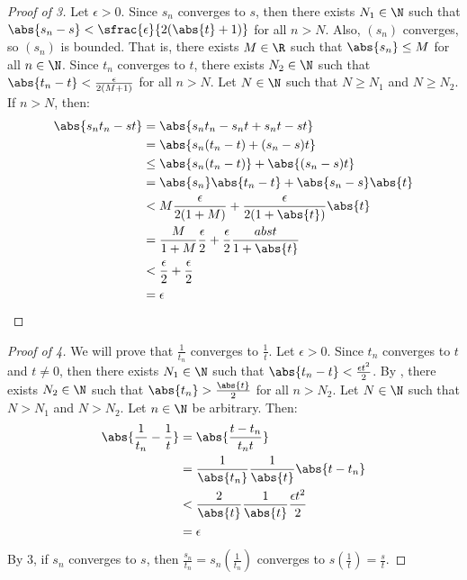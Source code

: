 \begin{thmbox}{}{}
    \begin{proof}[Proof of 3]
        Let $\epsilon > 0$. Since $s_n$ converges to $s$, then there exists $N_1 \in \N$ such that $\abs{s_n - s} < \sfrac{\epsilon}{2(\abs{t} + 1)}$ for all $n > N$. Also, $(s_n)$ converges, so $(s_n)$ is bounded. That is, there exists $M \in \R$ such that $\abs{s_n} \leq M$ for all $n \in \N$. Since $t_n$ converges to $t$, there exists $N_2 \in \N$ such that $\abs{t_n - t} < \frac{\epsilon}{2(M+1)}$ for all $n > N$. Let $N \in \N$ such that $N \geq N_1$ and $N \geq N_2$. If $n > N$, then:
        \begin{align*}
            \abs{s_nt_n - st}
            &= \abs{s_nt_n - s_nt + s_nt - st} \\
            &= \abs{s_n(t_n-t) + (s_n-s)t} \\
            &\leq \abs{s_n(t_n-t)} + \abs{(s_n-s)t} \\
            &= \abs{s_n} \abs{t_n-t} + \abs{s_n-s}\abs{t} \\
            &< M \frac{\epsilon}{2(1+M)} + \frac{\epsilon}{2(1+\abs{t})} \abs{t} \\
            &= \frac{M}{1+M} \frac{\epsilon}{2} + \frac{\epsilon}{2} \frac{abs{t}}{1 + \abs{t}} \\
            &< \frac{\epsilon}{2} + \frac{\epsilon}{2} \\
            &= \epsilon
        \end{align*}
    \end{proof}

    \begin{proof}[Proof of 4]
        We will prove that $\frac{1}{t_n}$ converges to $\frac{1}{t}$. Let $\epsilon > 0$. Since $t_n$ converges to $t$ and $t \neq 0$, then there exists $N_1 \in \N$ such that $\abs{t_n - t} < \frac{\epsilon t^2}{2}$. By , there exists $N_2 \in \N$ such that $\abs{t_n} > \frac{\abs{t}}{2}$ for all $n > N_2$. Let $N \in \N$ such that $N > N_1$ and $N > N_2$. Let $n \in \N$ be arbitrary. Then:
        \begin{align*}
            \abs{\frac{1}{t_n} - \frac{1}{t}} &= \abs{\frac{t-t_n}{t_nt}} \\
            &= \frac{1}{\abs{t_n}} \frac{1}{\abs{t}} \abs{t-t_n} \\
            &< \frac{2}{\abs{t}} \frac{1}{\abs{t}} \frac{\epsilon t^2}{2} \\
            &= \epsilon
        \end{align*}
        By 3, if $s_n$ converges to $s$, then $\frac{s_n}{t_n} = s_n \left( \frac{1}{t_n} \right) $ converges to $s \left( \frac{1}{t} \right) = \frac{s}{t}$.
    \end{proof}
\end{thmbox}

